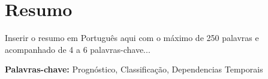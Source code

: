 
\section*{Resumo}


Inserir o resumo em Portugu\^{e}s aqui com o máximo de 250 palavras e acompanhado de 4 a 6 palavras-chave...

\vfill

\textbf{\Large Palavras-chave:} Prognóstico, Classificação, Dependencias Temporais

\cleardoublepage


